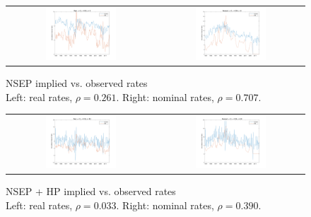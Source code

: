 \begin{figure}[h]
\ContinuedFloat
\centering
\captionsetup{singlelinecheck=false, justification=centering}
\caption{NSEP  implied vs. observed rates \\ Left: real rates, $\rho = 0.261$. Right: nominal rates, $\rho = 0.707$.}
\begin{tabular}{cc}
\includegraphics[width=0.5\textwidth]{figs/nipa/implied-vs-ffr/real_nsep} &
\includegraphics[width=0.5\textwidth]{figs/nipa/implied-vs-ffr/nominal_nsep}
\end{tabular}
\end{figure}

\begin{figure}[h]
\ContinuedFloat
\centering
\captionsetup{singlelinecheck=false, justification=centering}
\caption{NSEP + HP implied vs. observed rates \\ Left: real rates, $\rho = 0.033$. Right: nominal rates, $\rho = 0.390$.}
\begin{tabular}{cc}
\includegraphics[width=0.5\textwidth]{figs/nipa/implied-vs-ffr/real_nsep-hp} &
\includegraphics[width=0.5\textwidth]{figs/nipa/implied-vs-ffr/nominal_nsep-hp}
\end{tabular}
\end{figure}

